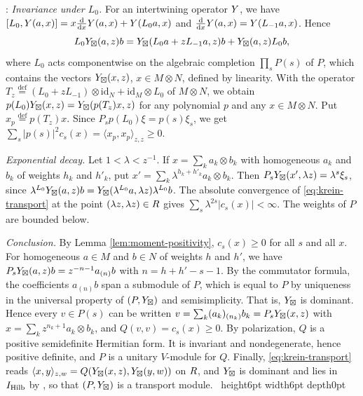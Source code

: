 \documentclass[leqno]{article}
\let\cal\relax
\newcommand{\cal}{\mathcal}
\renewcommand{\geq}{\ensuremath{\geqslant}}
\newcommand{\qed}{\hfill \vrule height6pt  width6pt depth0pt}
\newcommand{\ot}{\otimes}
\newcommand{\ov}{\overset}
\renewcommand{\d}{\mathop{}\mathopen{}\mathrm{d}} %
\renewcommand{\d}{\mathop{}\mathopen{}\mathrm{d}}
\newenvironment{proof}[1][]{\noindent {\it Proof #1} : }{\hbox{~}\qed
\smallskip
}
\numberwithin{equation}{section}
\begin{document}
\begin{proof}
\emph{Invariance under $L_0$.} For an intertwining operator $\cal Y$, we have $[L_0,\cal Y(a,x)] = x\frac{\d}{\d x}\cal Y(a,x)+\cal Y(L_0a,x)$ and $\frac{\d}{\d x}\cal Y(a,x) = \cal Y(L_{-1}a,x)$. Hence
\[
L_0\cal Y_\boxtimes(a,z)b = \cal Y_\boxtimes(L_0a+zL_{-1}a,z)b+\cal Y_\boxtimes(a,z)L_0b,
\]
where $L_0$ acts componentwise on the algebraic completion $\prod_s P(s)$ of $P$, which contains the vectors $\cal Y_\boxtimes(x,z)$, $x \in M \ot N$, defined by linearity. With the operator $T_z \ov{\mathrm{def}}{=} (L_0+zL_{-1}) \ot \mathrm{id}_N+\mathrm{id}_M \ot L_0$ of $M \ot N$, we obtain $p(L_0)\cal Y_\boxtimes(x,z) = \cal Y_\boxtimes(p(T_z)x,z)$ for any polynomial $p$ and any $x \in M \ot N$. Put $x_p \ov{\mathrm{def}}{=} p(T_z)x$. Since $P_s p(L_0)\xi = p(s)\xi_s$, we get $\sum_s |p(s)|^2c_s(x) = \langle x_p,x_p\rangle_{z,z} \geq 0$.

\emph{Exponential decay.} Let $1 < \lambda < z^{-1}$. If $x = \sum_k a_k \ot b_k$ with homogeneous $a_k$ and $b_k$ of weights $h_k$ and $h'_k$, put $x' = \sum_k \lambda^{h_k+h'_k}a_k \ot b_k$. Then $P_s\cal Y_\boxtimes(x',\lambda z) = \lambda^s\xi_s$, since $\lambda^{L_0}\cal Y_\boxtimes(a,z)b = \cal Y_\boxtimes(\lambda^{L_0}a,\lambda z)\lambda^{L_0}b$. The absolute convergence of \eqref{eq:krein-transport} at the point $(\lambda z,\lambda z) \in \cal R$ gives $\sum_s\lambda^{2s}|c_s(x)| < \infty$. The weights of $P$ are bounded below.

\emph{Conclusion.} By Lemma \ref{lem:moment-positivity}, $c_s(x) \geq 0$ for all $s$ and all $x$. For homogeneous $a \in M$ and $b \in N$ of weights $h$ and $h'$, we have $P_s\cal Y_\boxtimes(a,z)b = z^{-n-1}a_{(n)}b$ with $n = h+h'-s-1$. By the commutator formula, the coefficients $a_{(n)}b$ span a submodule of $P$, which is equal to $P$ by uniqueness in the universal property of $(P,\cal Y_\boxtimes)$ and semisimplicity. That is, $\cal Y_\boxtimes$ is dominant. Hence every $v \in P(s)$ can be written $v = \sum_k (a_k)_{(n_k)}b_k = P_s\cal Y_\boxtimes(x,z)$ with $x = \sum_k z^{n_k+1}a_k \ot b_k$, and $Q(v,v) = c_s(x) \geq 0$. By polarization, $Q$ is a positive semidefinite Hermitian form. It is invariant and nondegenerate, hence positive definite, and $P$ is a unitary $V$-module for $Q$. Finally, \eqref{eq:krein-transport} reads $\langle x,y\rangle_{z,w} = Q(\cal Y_\boxtimes(x,z),\cal Y_\boxtimes(y,w))$ on $\cal R$, and $\cal Y_\boxtimes$ is dominant and lies in $\cal I_{\mathrm{Hilb}}$ by \cite[Proposition 3.11 p.~33]{Ten24}, so that $(P,\cal Y_\boxtimes)$ is a transport module.
\end{proof}
\end{document}
